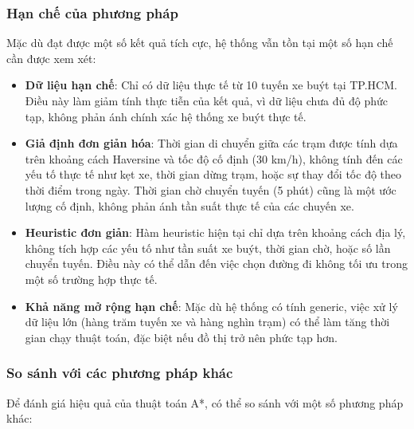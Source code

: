 \documentclass[a4paper,12pt]{article}
\begin{document}
\subsubsection{Hạn chế của phương pháp}

Mặc dù đạt được một số kết quả tích cực, hệ thống vẫn tồn tại một số hạn chế cần được xem xét:

\begin{itemize}
    \item \textbf{Dữ liệu hạn chế}: Chỉ có dữ liệu thực tế từ 10 tuyến xe buýt tại TP.HCM. Điều này làm giảm tính thực tiễn của kết quả, vì dữ liệu chưa đủ độ phức tạp, không phản ánh chính xác hệ thống xe buýt thực tế.
    
    \item \textbf{Giả định đơn giản hóa}: Thời gian di chuyển giữa các trạm được tính dựa trên khoảng cách Haversine và tốc độ cố định (30 km/h), không tính đến các yếu tố thực tế như kẹt xe, thời gian dừng trạm, hoặc sự thay đổi tốc độ theo thời điểm trong ngày. Thời gian chờ chuyển tuyến (5 phút) cũng là một ước lượng cố định, không phản ánh tần suất thực tế của các chuyến xe.
    
    \item \textbf{Heuristic đơn giản}: Hàm heuristic hiện tại chỉ dựa trên khoảng cách địa lý, không tích hợp các yếu tố như tần suất xe buýt, thời gian chờ, hoặc số lần chuyển tuyến. Điều này có thể dẫn đến việc chọn đường đi không tối ưu trong một số trường hợp thực tế.
    
    \item \textbf{Khả năng mở rộng hạn chế}: Mặc dù hệ thống có tính generic, việc xử lý dữ liệu lớn (hàng trăm tuyến xe và hàng nghìn trạm) có thể làm tăng thời gian chạy thuật toán, đặc biệt nếu đồ thị trở nên phức tạp hơn.
\end{itemize}

\subsubsection{So sánh với các phương pháp khác}

Để đánh giá hiệu quả của thuật toán A*, có thể so sánh với một số phương pháp khác:
\end{document}
